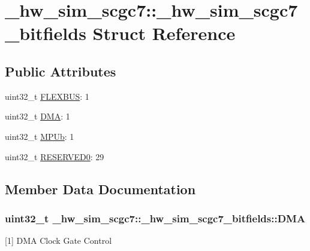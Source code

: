 \hypertarget{struct__hw__sim__scgc7_1_1__hw__sim__scgc7__bitfields}{}\section{\+\_\+hw\+\_\+sim\+\_\+scgc7\+:\+:\+\_\+hw\+\_\+sim\+\_\+scgc7\+\_\+bitfields Struct Reference}
\label{struct__hw__sim__scgc7_1_1__hw__sim__scgc7__bitfields}
\subsection*{Public Attributes}
\begin{DoxyCompactItemize}
\item 
uint32\+\_\+t \hyperlink{struct__hw__sim__scgc7_1_1__hw__sim__scgc7__bitfields_a30228123d7951ff4b9129458722cbbc1}{F\+L\+E\+X\+B\+US}\+: 1
\item 
uint32\+\_\+t \hyperlink{struct__hw__sim__scgc7_1_1__hw__sim__scgc7__bitfields_ab6b095528f980f976a9558fc228d3a49}{D\+MA}\+: 1
\item 
uint32\+\_\+t \hyperlink{struct__hw__sim__scgc7_1_1__hw__sim__scgc7__bitfields_a69885aaa5b66bee51c51c3740d3c25d8}{M\+P\+Ub}\+: 1
\item 
uint32\+\_\+t \hyperlink{struct__hw__sim__scgc7_1_1__hw__sim__scgc7__bitfields_a3205c621cf5797fd2d5f79c6da81c73b}{R\+E\+S\+E\+R\+V\+E\+D0}\+: 29
\end{DoxyCompactItemize}


\subsection{Member Data Documentation}
\subsubsection[{\texorpdfstring{D\+MA}{DMA}}]{\setlength{\rightskip}{0pt plus 5cm}uint32\+\_\+t \+\_\+hw\+\_\+sim\+\_\+scgc7\+::\+\_\+hw\+\_\+sim\+\_\+scgc7\+\_\+bitfields\+::\+D\+MA}\hypertarget{struct__hw__sim__scgc7_1_1__hw__sim__scgc7__bitfields_ab6b095528f980f976a9558fc228d3a49}{}\label{struct__hw__sim__scgc7_1_1__hw__sim__scgc7__bitfields_ab6b095528f980f976a9558fc228d3a49}
\mbox{[}1\mbox{]} D\+MA Clock Gate Control 
